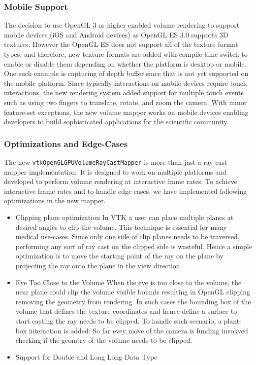 \subsubsection{Mobile Support}
The decision to use OpenGL 3 or higher enabled volume rendering to support mobile devices (iOS and Android devices) as OpenGL ES 3.0 supports 3D textures. However the OpenGL ES does not support all of the texture format types, and therefore, new texture formats are added with compile time switch to enable or disable them depending on whether the platform is desktop or mobile. One such example is capturing of depth buffer since that is not yet supported on the mobile platform.  Since typically interactions on mobile devices require touch interactions, the new rendering system added support for multiple touch events such as using two fingers to translate, rotate, and zoom the camera. With minor feature-set exceptions, the new volume mapper works on mobile devices enabling developers to build sophisticated applications for the scientific community.

\subsubsection{Optimizations and Edge-Cases}
The new \texttt{vtkOpenGLGPUVolumeRayCastMapper} is more than just a ray cast mapper implementation. It is designed to work on multiple platforms and developed to perform volume rendering at interactive frame rates. To achieve interactive frame rates and to handle edge cases, we have implemented following optimizations in the new mapper. 

\begin{itemize}
\item Clipping plane optimization 
In VTK a user can place multiple planes at desired angles to clip the volume. This technique is essential for many medical use-cases. Since only one side of clip planes needs to be traversed, performing any sort of ray cast on the clipped side is wasteful. Hence a simple optimization is to move the starting point of the ray on the plane by projecting the ray onto the plane in the view direction. 

\item Eye Too Close to the Volume
When the eye is too close to the volume, the near plane could clip the volume visible bounds resulting in OpenGL clipping removing the geometry from rendering. In such cases the bounding box of the volume that defines the texture coordinates and hence define a surface to start casting the ray needs to be clipped. To handle such scenario, a plant-box interaction is added. So far evey move of the camera is funding invokved checking if the geomtry of the volume needs to be clipped.

\item Support for Double and Long Long Data Type


\end{itemize}